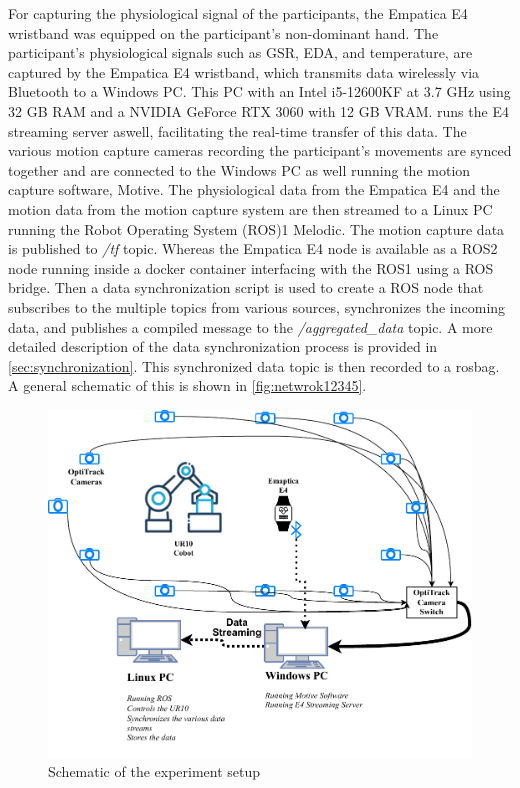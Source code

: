For capturing the physiological signal of the participants, the Empatica E4 wristband was equipped on the participant's non-dominant hand. The participant's physiological signals such as \gls{GSR}, \gls{EDA},  and temperature, are captured by the Empatica E4 wristband, which transmits data wirelessly via Bluetooth to a Windows PC. This PC with an Intel i5-12600KF at 3.7 GHz using
32 GB RAM and a NVIDIA GeForce RTX 3060 with 12 GB
VRAM.
runs the E4 streaming server aswell, facilitating the real-time transfer of this data. The various motion capture cameras recording the participant's movements are synced  together and are connected to the Windows PC as well running the motion capture software, Motive.
The physiological data from the Empatica E4 and the motion data from the motion capture system are then streamed to a Linux PC running the Robot Operating System (ROS)1 Melodic.
The motion capture data is published to \textit{/tf} topic. Whereas the Empatica E4 node is available as a ROS2 node running inside a docker container interfacing with the ROS1 using a ROS bridge.
Then a data synchronization script is used to create a ROS node that subscribes to the multiple topics from various sources, synchronizes the incoming data, and publishes a compiled message to the \textit{/aggregated\_data} topic. A more detailed description of the data synchronization process is provided in  \autoref{sec:synchronization}.
This synchronized data topic is then recorded to a rosbag. A general schematic of this is shown in \autoref{fig:netwrok12345}.


\begin{figure}[h]
	\centering
	\includegraphics[width=0.9\columnwidth]{images/Experiment system.drawio.pdf}
	\caption{Schematic of the experiment setup}
	\label{fig:netwrok12345}
\end{figure}


